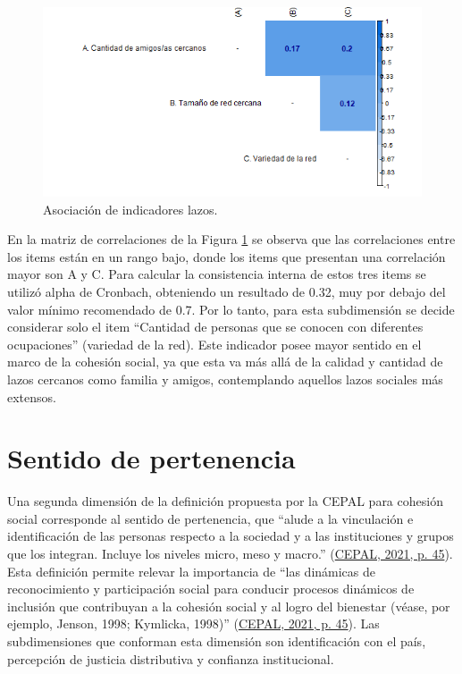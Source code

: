 \documentclass[
  12pt,
]{book}
\begin{document}
\begin{figure}[H]

{\centering \includegraphics[width=1\linewidth,height=1\textheight]{output/graphs/lazos_cor} 

}

\caption{Asociación de indicadores lazos.}\label{fig:lazos-cor}
\end{figure}

En la matriz de correlaciones de la Figura \ref{fig:lazos-cor} se observa que las correlaciones entre los items están en un rango bajo, donde los items que presentan una correlación mayor son A y C. Para calcular la consistencia interna de estos tres items se utilizó alpha de Cronbach, obteniendo un resultado de 0.32, muy por debajo del valor mínimo recomendado de 0.7. Por lo tanto, para esta subdimensión se decide considerar solo el item ``Cantidad de personas que se conocen con diferentes ocupaciones'' (variedad de la red). Este indicador posee mayor sentido en el marco de la cohesión social, ya que esta va más allá de la calidad y cantidad de lazos cercanos como familia y amigos, contemplando aquellos lazos sociales más extensos.

\hypertarget{sentido-de-pertenencia}{%
\section{Sentido de pertenencia}\label{sentido-de-pertenencia}}

Una segunda dimensión de la definición propuesta por la CEPAL para cohesión social corresponde al sentido de pertenencia, que ``alude a la vinculación e identificación de las personas respecto a la sociedad y a las instituciones y grupos que los integran. Incluye los niveles micro, meso y macro.'' (\protect\hyperlink{ref-cepal_cohesion_2021}{CEPAL, 2021, p. 45}). Esta definición permite relevar la importancia de ``las dinámicas de reconocimiento y participación social para conducir procesos dinámicos de inclusión que contribuyan a la cohesión social y al logro del bienestar (véase, por ejemplo, Jenson, 1998; Kymlicka, 1998)'' (\protect\hyperlink{ref-cepal_cohesion_2021}{CEPAL, 2021, p. 45}). Las subdimensiones que conforman esta dimensión son identificación con el país, percepción de justicia distributiva y confianza institucional.
\end{document}
